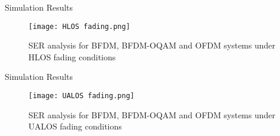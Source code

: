 \documentclass{beamer}
\begin{document}
\begin{frame}{Simulation Results}
 \begin{figure}[ht]
    \texttt{[image: HLOS fading.png]}
    \label{HLOS fading simulation}
    \caption{ SER analysis for BFDM, BFDM-OQAM and OFDM systems under HLOS fading conditions}
    \end{figure}
\end{frame}
\begin{frame}{Simulation Results}
     \begin{figure}[ht]
    \texttt{[image: UALOS fading.png]}
    \label{UALOS fading simulation}
    \caption{ SER analysis for BFDM, BFDM-OQAM and OFDM systems under UALOS fading conditions}
    \end{figure}
\end{frame}
\end{document}
